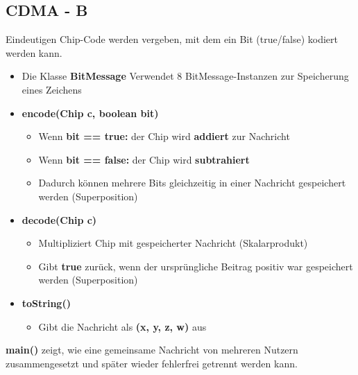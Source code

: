 \subsection*{CDMA - B}
Eindeutigen Chip-Code werden vergeben, mit dem ein Bit (true/false) kodiert werden kann.
\begin{itemize}[itemsep=0pt]
   \item Die Klasse \textbf{BitMessage} Verwendet 8 BitMessage-Instanzen zur Speicherung eines Zeichens
   \item \textbf{encode(Chip c, boolean bit)}
   \begin{itemize}
    \item Wenn \textbf{bit == true:} der Chip wird \textbf{addiert} zur Nachricht
    \item Wenn \textbf{bit == false:} der Chip wird \textbf{subtrahiert}
    \item Dadurch können mehrere Bits gleichzeitig in einer Nachricht gespeichert werden (Superposition)
   \end{itemize}
   \item \textbf{decode(Chip c)}
   \begin{itemize}
    \item Multipliziert Chip mit gespeicherter Nachricht (Skalarprodukt)
    \item Gibt \textbf{true} zurück, wenn der ursprüngliche Beitrag positiv war gespeichert werden (Superposition)
   \end{itemize}
   \item \textbf{toString()}
   \begin{itemize}
    \item Gibt die Nachricht als \textbf{(x, y, z, w)} aus
   \end{itemize}
\end{itemize}
\textbf{main()} zeigt, wie eine gemeinsame Nachricht von mehreren Nutzern zusammengesetzt und später wieder fehlerfrei getrennt werden kann.
\begin{codeblock}
    
\end{codeblock}

